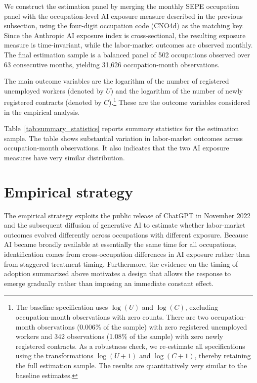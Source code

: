 \documentclass[11pt]{article}
\begin{document}
We construct the estimation panel by merging the monthly SEPE occupation panel with the occupation-level AI exposure measure described in the previous subsection, using the four-digit occupation code (CNO4d) as the matching key. Since the Anthropic AI exposure index is cross-sectional, the resulting exposure measure is time-invariant, while the labor-market outcomes are observed monthly. The final estimation sample is a balanced panel of 502 occupations observed over 63 consecutive months, yielding 31,626 occupation-month observations.

The main outcome variables are the logarithm of the number of registered unemployed workers (denoted by $U$) and the logarithm of the number of newly registered contracts (denoted by $C$).\footnote{The baseline specification uses $\log(U)$ and $\log(C)$, excluding occupation-month observations with zero counts. There are two occupation-month observations (0.006\% of the sample) with zero registered unemployed workers and 342 observations (1.08\% of the sample) with zero newly registered contracts. As a robustness check, we re-estimate all specifications using the transformations $\log(U+1)$ and $\log(C+1)$, thereby retaining the full estimation sample. The results are quantitatively very similar to the baseline estimates.} These are the outcome variables considered in the empirical analysis. 

Table~\ref{tab:summary_statistics} reports summary statistics for the estimation sample. The table shows substantial variation in labor-market outcomes across occupation-month observations. It also indicates that the two AI exposure measures have very similar distribution.

\clearpage



\section{Empirical strategy}
\label{sec:empirical_strategy}

The empirical strategy exploits the public release of ChatGPT in November 2022 and the subsequent diffusion of generative AI to estimate whether labor-market outcomes evolved differently across occupations with different exposure. Because AI became broadly available at essentially the same time for all occupations, identification comes from cross-occupation differences in AI exposure rather than from staggered treatment timing. Furthermore, the evidence on the timing of adoption summarized above motivates a design that allows the response to emerge gradually rather than imposing an immediate constant effect.
\end{document}
